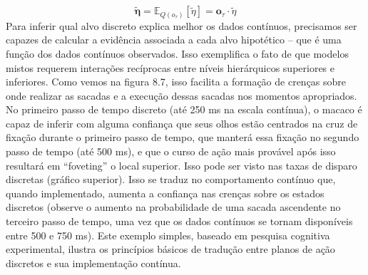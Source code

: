 \documentclass[
  12pt,
]{book}
\begin{document}
\[ \pmb {\tilde \eta} = \mathbb E_{Q(o_\tau)}[\tilde \eta]= \pmb o_\tau \cdot \tilde \eta  \]
Para inferir qual alvo discreto explica melhor os dados contínuos, precisamos ser capazes de calcular a evidência associada a cada alvo hipotético -- que é uma função dos dados contínuos observados. Isso exemplifica o fato de que modelos mistos requerem interações recíprocas entre níveis hierárquicos superiores e inferiores. Como vemos na figura 8.7, isso facilita a formação de crenças sobre onde realizar as sacadas e a execução dessas sacadas nos momentos apropriados. No primeiro passo de tempo discreto (até 250 ms na escala contínua), o macaco é capaz de inferir com alguma confiança que seus olhos estão centrados na cruz de fixação durante o primeiro passo de tempo, que manterá essa fixação no segundo passo de tempo (até 500 ms), e que o curso de ação mais provável após isso resultará em ``foveting'' o local superior. Isso pode ser visto nas taxas de disparo discretas (gráfico superior). Isso se traduz no comportamento contínuo que, quando implementado, aumenta a confiança nas crenças sobre os estados discretos (observe o aumento na probabilidade de uma sacada ascendente no terceiro passo de tempo, uma vez que os dados contínuos se tornam disponíveis entre 500 e 750 ms). Este exemplo simples, baseado em pesquisa cognitiva experimental, ilustra os princípios básicos de tradução entre planos de ação discretos e sua implementação contínua.
\end{document}
